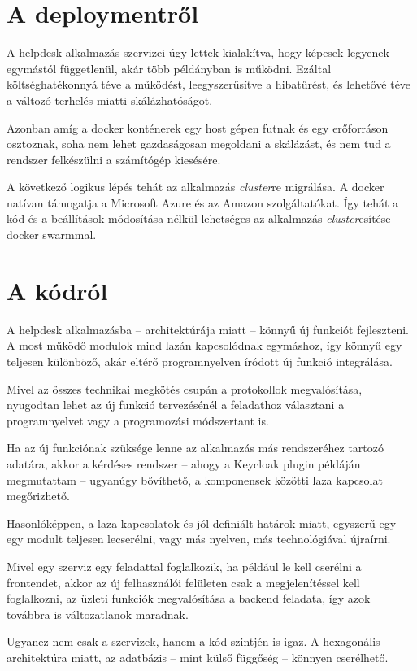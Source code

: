 \section{A deploymentről}

A helpdesk alkalmazás szervizei úgy lettek kialakítva, hogy képesek legyenek egymástól függetlenül, akár több példányban is működni. Ezáltal költséghatékonnyá téve a működést, leegyszerűsítve a hibatűrést, és lehetővé téve a változó terhelés miatti skálázhatóságot.

Azonban amíg a docker konténerek egy host gépen futnak és egy erőforráson osztoznak, soha nem lehet gazdaságosan megoldani a skálázást, és nem tud a rendszer felkészülni a számítógép kiesésére.

A következő logikus lépés tehát az alkalmazás \textit{cluster}re migrálása. A docker natívan támogatja a Microsoft Azure és az Amazon \cite{docker_website_deploy_ECS} szolgáltatókat. Így tehát a kód és a beállítások módosítása nélkül lehetséges az alkalmazás \textit{cluster}esítése docker swarmmal.

\bigskip
\section{A kódról}
A helpdesk alkalmazásba --  architektúrája miatt --   könnyű új funkciót fejleszteni. A most működő modulok mind lazán kapcsolódnak egymáshoz, így könnyű egy teljesen különböző, akár eltérő programnyelven íródott új funkció integrálása.

Mivel az összes technikai megkötés csupán a protokollok megvalósítása, nyugodtan lehet az új funkció tervezésénél a feladathoz választani a programnyelvet vagy a programozási módszertant is. 

Ha az új funkciónak szüksége lenne az alkalmazás más rendszeréhez tartozó adatára, akkor a kérdéses rendszer --  ahogy a Keycloak plugin példáján megmutattam --   ugyanúgy bővíthető, a komponensek közötti laza kapcsolat megőrizhető.

Hasonlóképpen, a laza kapcsolatok és jól definiált határok miatt, egyszerű egy-egy modult teljesen lecserélni, vagy más nyelven, más technológiával újraírni.

Mivel egy szerviz egy feladattal foglalkozik, ha például le	 kell cserélni a frontendet, akkor az új felhasználói felületen csak a megjelenítéssel kell foglalkozni, az üzleti funkciók megvalósítása a backend feladata, így azok továbbra is változatlanok maradnak.

Ugyanez nem csak a szervizek, hanem a kód szintjén is igaz. A hexagonális architektúra miatt, az adatbázis --  mint külső függőség --   könnyen cserélhető. 

